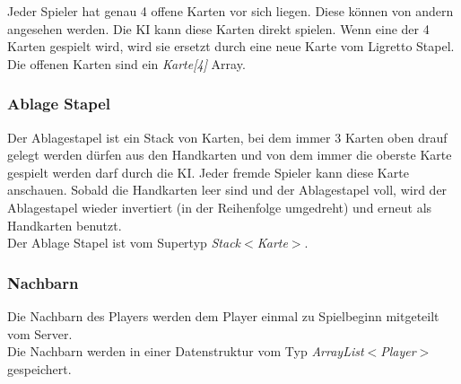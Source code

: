 Jeder Spieler hat genau 4 offene Karten vor sich liegen. Diese können von andern angesehen werden. Die KI kann diese Karten direkt spielen. Wenn eine der 4 Karten gespielt wird, wird sie ersetzt durch eine neue Karte vom Ligretto Stapel.\\[3mm]
Die offenen Karten sind ein \textit{Karte[4]} Array.

\subsubsection{Ablage Stapel}

Der Ablagestapel ist ein Stack von Karten, bei dem immer 3 Karten oben drauf gelegt werden dürfen aus den Handkarten und von dem immer die oberste Karte gespielt werden darf durch die KI. Jeder fremde Spieler kann diese Karte anschauen. Sobald die Handkarten leer sind und der Ablagestapel voll, wird der Ablagestapel wieder invertiert (in der Reihenfolge umgedreht) und erneut als Handkarten benutzt.\\[3mm]
Der Ablage Stapel ist vom Supertyp \textit{Stack$<$Karte$>$}.

\subsubsection{Nachbarn}

Die Nachbarn des Players werden dem Player einmal zu Spielbeginn mitgeteilt vom Server.\\[3mm]
Die Nachbarn werden in einer Datenstruktur vom Typ \textit{ArrayList$<$Player$>$} gespeichert.

